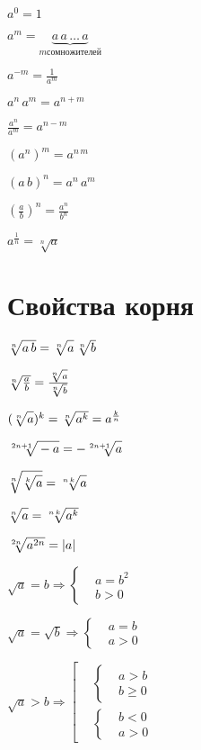 $ a^0 = 1 $

$ a^m = \underbrace{a\, a \, \ldots \, a }_{m сомножителей} $

$ a^{-m} = \frac{1}{a^m} $

$ a^n\, a^m = a^{n+m} $

$ \frac{a^n}{a^m} = a^{n-m} $

$ (a^n)^m = a^{n\, m} $

$ (a\, b)^n = a^n\, a^m $

$ \left(\frac{a}{b} \right)^n = \frac{a^n}{b^n} $

$ a^{\frac{1}{n}} = \sqrt[n]{a} $


\section{Свойства корня}

$ \sqrt[n]{\mathstrut a\, b} = \sqrt[n]{\mathstrut a} \, \sqrt[n]{\mathstrut b} $

$ \sqrt[n]{\mathstrut \frac{a}{b}} = \frac{\sqrt[n]{\mathstrut a}}{\sqrt[n]{\mathstrut b}} $

$ (\sqrt[n]{\mathstrut a})^k = \sqrt[n]{\mathstrut a^k} = a^{\frac{k}{n}} $

$ \sqrt[2n + 1]{\mathstrut -a} = -\sqrt[2n + 1]{\mathstrut a} $

$ \sqrt[n]{\mathstrut \sqrt[k]{\mathstrut a}} = \sqrt[n\, k]{\mathstrut a} $

$ \sqrt[n]{\mathstrut a} = \sqrt[n\, k]{\mathstrut a^k} $

$ \sqrt[2n]{\mathstrut a^{2n}} = |a| $

$ \sqrt{a} = b \Rightarrow  \left\{ \begin{aligned}
	& a = b^2 \\
	& b > 0
\end{aligned}\right. $

$ \sqrt{a} = \sqrt{b} \Rightarrow  \left\{ \begin{aligned}
	& a = b \\
	& a > 0
\end{aligned}\right. $

$ \sqrt{a} > b \Rightarrow  \left[ \begin{aligned}
	& \left\{ \begin{aligned}
		& a > b \\
		& b \geqslant 0
	\end{aligned} \right. \\
	& \left\{ \begin{aligned}
		& b < 0 \\
		& a > 0
	\end{aligned} \right.
\end{aligned} \right. $

